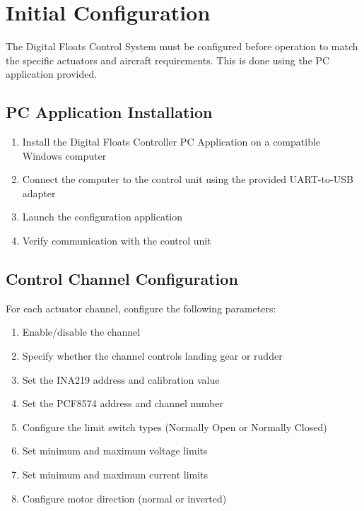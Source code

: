 \documentclass[12pt,a4paper,twoside,openright]{book}
\begin{document}
\section{Initial Configuration}

The Digital Floats Control System must be configured before operation to match the specific actuators and aircraft requirements. This is done using the PC application provided.

\subsection{PC Application Installation}

\begin{enumerate}
    \item Install the Digital Floats Controller PC Application on a compatible Windows computer
    \item Connect the computer to the control unit using the provided UART-to-USB adapter
    \item Launch the configuration application
    \item Verify communication with the control unit
\end{enumerate}

\subsection{Control Channel Configuration}

For each actuator channel, configure the following parameters:

\begin{enumerate}
    \item Enable/disable the channel
    \item Specify whether the channel controls landing gear or rudder
    \item Set the INA219 address and calibration value
    \item Set the PCF8574 address and channel number
    \item Configure the limit switch types (Normally Open or Normally Closed)
    \item Set minimum and maximum voltage limits
    \item Set minimum and maximum current limits
    \item Configure motor direction (normal or inverted)
\end{enumerate}
\end{document}
